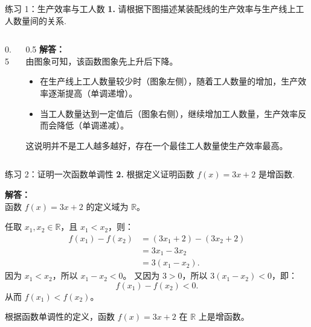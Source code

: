 \documentclass[aspectratio=169, 10pt]{beamer}
\begin{document}
	\begin{frame}{练习 1：生产效率与工人数}
		\textbf{\textcolor{myblue}{1.}} 请根据下图描述某装配线的生产效率与生产线上工人数量间的关系.
		
		\begin{columns}
			\begin{column}{0.5\textwidth}
			\end{column}
			\begin{column}{0.5\textwidth}
				\textbf{解答：}\\
				由图象可知，该函数图象先上升后下降。
				\begin{itemize}
					\item 在生产线上工人数量较少时（图象左侧），随着工人数量的增加，生产效率逐渐提高（单调递增）。
					\item 当工人数量达到一定值后（图象右侧），继续增加工人数量，生产效率反而会降低（单调递减）。
				\end{itemize}
				这说明并不是工人越多越好，存在一个最佳工人数量使生产效率最高。
			\end{column}
		\end{columns}
	\end{frame}
	
	\begin{frame}{练习 2：证明一次函数单调性}
		\textbf{\textcolor{myblue}{2.}} 根据定义证明函数 \(f(x)=3x+2\) 是增函数.
		
		\vspace{0.5cm}
		\textbf{解答：}\\
		函数 \(f(x)=3x+2\) 的定义域为 \(\mathbb{R}\)。
		
		任取 \(x_1, x_2 \in \mathbb{R}\)，且 \(x_1 < x_2\)，则：
		\begin{align*}
			f(x_1) - f(x_2) &= (3x_1 + 2) - (3x_2 + 2) \\
			&= 3x_1 - 3x_2 \\
			&= 3(x_1 - x_2).
		\end{align*}
		因为 \(x_1 < x_2\)，所以 \(x_1 - x_2 < 0\)。
		又因为 \(3 > 0\)，所以 \(3(x_1 - x_2) < 0\)，即：
		\[
		f(x_1) - f(x_2) < 0.
		\]
		从而 \(f(x_1) < f(x_2)\)。
		
		根据函数单调性的定义，函数 \(f(x)=3x+2\) 在 \(\mathbb{R}\) 上是增函数。
	\end{frame}
	
\end{document}
